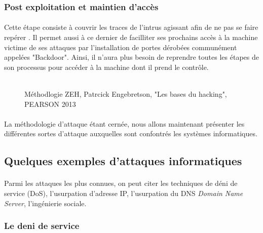   \subsubsection{Post exploitation et maintien d’accès}
    \paragraph{}
      Cette étape consiste à couvrir les traces de l'intrus agissant afin de ne pas se faire repérer \cite{E}. Il permet aussi à ce dernier de facilliter ses prochains accès à la machine victime de ses attaques par l'installation de portes dérobées communément appelées "Backdoor". Ainsi, il n'aura plus besoin de reprendre toutes les étapes de son processus pour accéder à la machine dont il prend le contrôle.\\ \\
      

\begin{figure}[H]
  \begin{center}
  \end{center}
  \caption[Représentation cyclique de la méthodologie ZEH.]
    {Méthodlogie ZEH, Patrcick Engebretson, "Les bases du hacking", PEARSON 2013}
    \label{Methodologie d'intrusion}
\end{figure}

\paragraph{}
  La méthodologie d'attaque étant cernée, nous allons maintenant présenter les différentes sortes d'attaque auxquelles sont confontrés les systèmes informatiques.	    
		    
\subsection{Quelques exemples d'attaques informatiques}
  \paragraph{}
    Parmi les attaques les plus connues, on peut citer les techniques de déni de service (DoS), l'usurpation d'adresse IP, l'usurpation du DNS \textit{Domain Name Server}, l'ingénierie sociale.		    
	
  \subsubsection{Le deni de service}
